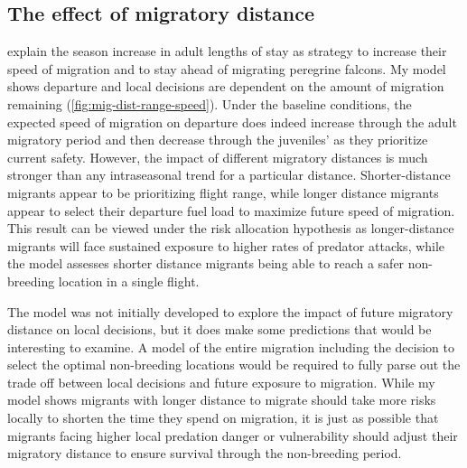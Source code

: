 
\subsection*{The effect of migratory distance}

\citet{Hope2011} explain the season increase in adult lengths of stay as strategy to increase their speed of migration and to stay ahead of migrating peregrine falcons. My model shows departure and local decisions are dependent on the amount of migration remaining (\autoref{fig:mig-dist-range-speed}). Under the baseline conditions, the expected speed of migration on departure does indeed increase through the adult migratory period and then decrease through the juveniles' as they prioritize current safety. However, the impact of different migratory distances is much stronger than any intraseasonal trend for a particular distance. Shorter-distance migrants appear to be prioritizing flight range, while longer distance migrants appear to select their departure fuel load to maximize future speed of migration. This result can be viewed under the risk allocation hypothesis \citep{Lima1999a} as longer-distance migrants will face sustained exposure to higher rates of predator attacks, while the model assesses shorter distance migrants being able to reach a safer non-breeding location in a single flight.

The model was not initially developed to explore the impact of future migratory distance on local decisions, but it does make some predictions that would be interesting to examine. A model of the entire migration including the decision to select the optimal non-breeding locations would be required to fully parse out the trade off between local decisions and future exposure to migration. While my model shows migrants with longer distance to migrate should take more risks locally to shorten the time they spend on migration, it is just as possible that migrants facing higher local predation danger or vulnerability should adjust their migratory distance to ensure survival through the non-breeding period. 


